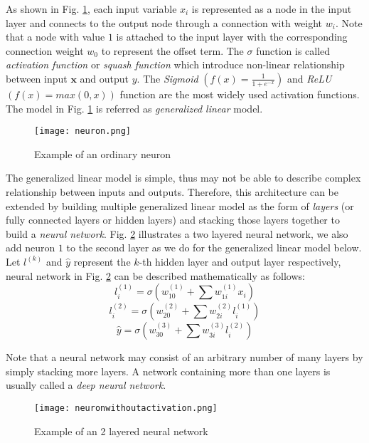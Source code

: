 \documentclass[conference]{IEEEtran}
\begin{document}
As shown in Fig. \ref{fig:neuron}, each input variable $x_i$ is represented as a node in the input layer and connects to the output node through a connection with weight $w_i$. Note that a node with value $1$ is attached to the input layer with the corresponding connection weight $w_0$ to represent the offset term. The $\sigma$ function is called \textit{activation function} or \textit{squash function} which introduce non-linear relationship between input $\mathbf{x}$ and output $y$. The \textit{Sigmoid} $\left( f(x) = \frac{1}{1+e^{-x}}\right) $ and \textit{ReLU} $\left( f(x) = max(0, x) \right)$ function are the most widely used activation functions. The model in Fig. \ref{fig:neuron} is referred as \textit{generalized linear} model. 

\begin{figure}[htbp]
    \centering
    \texttt{[image: neuron.png]}
    \caption{Example of an ordinary neuron}
    \label{fig:neuron}
\end{figure}

The generalized linear model is simple, thus may not be able to describe complex relationship between inputs and outputs. Therefore, this architecture can be extended by building multiple generalized linear model as the form of \textit{layers} (or fully connected layers or hidden layers) and stacking those layers together to build a \textit{neural network}. Fig. \ref{fig:neuralnet} illustrates a two layered neural network, we also add neuron $1$ to the second layer as we do for the generalized linear model below. Let $l^{(k)}$ and $\hat{y}$ represent the $k$-th hidden layer and output layer respectively, neural network in Fig. \ref{fig:neuralnet} can be described mathematically as follows:
$$l_i^{(1)} = \sigma \left(w^{(1)}_{10} + \sum w^{(1)}_{1i}x_i \right) $$
$$l_i^{(2)} = \sigma \left(w^{(2)}_{20} + \sum w^{(2)}_{2i}l_i^{(1)} \right) $$
$$\hat{y} = \sigma \left(w^{(3)}_{30} + \sum w^{(3)}_{3i}l_i^{(2)} \right) $$



Note that a neural network may consist of an arbitrary number of many layers by simply stacking more layers. A network containing more than one layers is usually called a \textit{deep neural network}.

\begin{figure}[htbp]
    \centering
    \texttt{[image: neuronwithoutactivation.png]}
    \caption{Example of an 2 layered neural network}
    \label{fig:neuralnet}
\end{figure}
\end{document}
